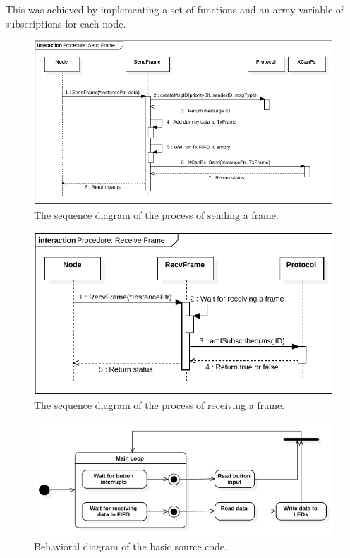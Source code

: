 This was achieved by implementing a set of functions and an array variable of subscriptions for each node.

\begin{figure}[h!]
	\centering
	\includegraphics[width = 1.1\linewidth]{graphics/SeqDiagram_SendFrame.pdf}
	\caption{The sequence diagram of the process of sending a frame.}
	\label{fig:SeqDiagram_SendFrame}
\end{figure}

\begin{figure}[h!]
	\centering
	\includegraphics[width = 1.1\linewidth]{graphics/SeqDiagram_RecvFrame.pdf}
	\caption{The sequence diagram of the process of receiving a frame.}
	\label{fig:SeqDiagram_RecvFrame}
\end{figure}



\begin{figure}[h!]
	\centering
	\includegraphics[width = 1.1\linewidth]{graphics/StateDiagram_CanStackTestCode.pdf}
	\caption{Behavioral diagram of the basic source code.}
	\label{fig:CAN_Testing_StateDiagr_Code}
\end{figure}
